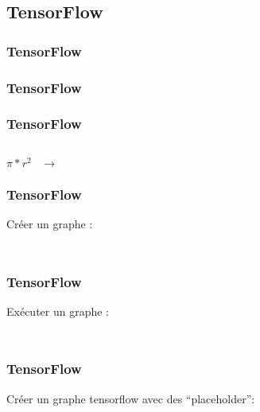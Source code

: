 \subsection{TensorFlow}


\begin{frame}
  \frametitle{TensorFlow}
\end{frame}

\begin{frame}
  \frametitle{TensorFlow}
\end{frame}

\begin{frame}
  \frametitle{TensorFlow}
  \begin{minipage}[l]{0.15\linewidth}
      $\;$
  \end{minipage}\hfill
  \begin{minipage}[l]{0.35\linewidth}
    \huge
    \begin{center}
      $\pi*r^2\;\;\;\rightarrow$
    \end{center}
  \end{minipage}\hfill
  \begin{minipage}[l]{0.49\linewidth}
  \end{minipage}\hfill
\end{frame}

\begin{frame}
  \frametitle{TensorFlow}
  Créer un graphe :
  \inputminted[linenos,fontsize=\small,bgcolor=pythonbg]{python}{code/tf-create_graph.py}
  \inputminted[linenos,fontsize=\small,bgcolor=returnbg]{text}{code/tf-create_graph.txt}
\end{frame}

\begin{frame}
  \frametitle{TensorFlow}
  Exécuter un graphe :
  \inputminted[linenos,fontsize=\small,bgcolor=pythonbg]{python}{code/tf-run_graph.py}
  \inputminted[linenos,fontsize=\small,bgcolor=returnbg]{text}{code/tf-run_graph.txt}
\end{frame}

\begin{frame}
  \frametitle{TensorFlow}
  Créer un graphe tensorflow avec des ``placeholder'':
  \inputminted[linenos,fontsize=\small,bgcolor=pythonbg]{python}{code/tf-create_graph_placeholder.py}
  \inputminted[linenos,fontsize=\small,bgcolor=returnbg]{text}{code/tf-create_graph_placeholder.txt}
\end{frame}

